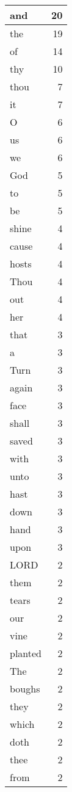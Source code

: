 \begin{center}
\begin{longtable}{l|r}
\hline \hline
\endlastfoot
and & 20 \\ \hline
the & 19 \\ \hline
of & 14 \\ \hline
thy & 10 \\ \hline
thou & 7 \\ \hline
it & 7 \\ \hline
O & 6 \\ \hline
us & 6 \\ \hline
we & 6 \\ \hline
God & 5 \\ \hline
to & 5 \\ \hline
be & 5 \\ \hline
shine & 4 \\ \hline
cause & 4 \\ \hline
hosts & 4 \\ \hline
Thou & 4 \\ \hline
out & 4 \\ \hline
her & 4 \\ \hline
that & 3 \\ \hline
a & 3 \\ \hline
Turn & 3 \\ \hline
again & 3 \\ \hline
face & 3 \\ \hline
shall & 3 \\ \hline
saved & 3 \\ \hline
with & 3 \\ \hline
unto & 3 \\ \hline
hast & 3 \\ \hline
down & 3 \\ \hline
hand & 3 \\ \hline
upon & 3 \\ \hline
LORD & 2 \\ \hline
them & 2 \\ \hline
tears & 2 \\ \hline
our & 2 \\ \hline
vine & 2 \\ \hline
planted & 2 \\ \hline
The & 2 \\ \hline
boughs & 2 \\ \hline
they & 2 \\ \hline
which & 2 \\ \hline
doth & 2 \\ \hline
thee & 2 \\ \hline
from & 2 \\ \hline

\end{longtable}
\end{center}
